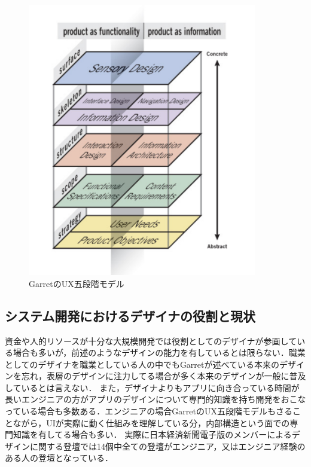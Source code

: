 \begin{figure}[htbp]
  \begin{minipage}{\hsize}
    \begin{center}
       \includegraphics[width=100mm]{img/uxmodel.png}
    \end{center}
    \caption{GarretのUX五段階モデル\cite{garrett2010elements}}
    \label{fig:garretuxmodel}
  \end{minipage}
\end{figure}

\subsection{システム開発におけるデザイナの役割と現状}


資金や人的リソースが十分な大規模開発では役割としてのデザイナが参画している場合も多いが，前述のようなデザインの能力を有しているとは限らない．職業としてのデザイナを職業としている人の中でもGarretが述べている本来のデザインを忘れ，表層のデザインに注力してる場合が多く本来のデザインが一般に普及しているとは言えない．
また，デザイナよりもアプリに向き合っている時間が長いエンジニアの方がアプリのデザインについて専門的知識を持ち開発をおこなっている場合も多数ある．エンジニアの場合GarretのUX五段階モデルもさることながら，UIが実際に動く仕組みを理解している分，内部構造という面での専門知識を有してる場合も多い．
実際に日本経済新聞電子版のメンバーによるデザインに関する登壇では14個中全ての登壇がエンジニア，又はエンジニア経験のある人の登壇となっている．\cite{nikkeislide}

